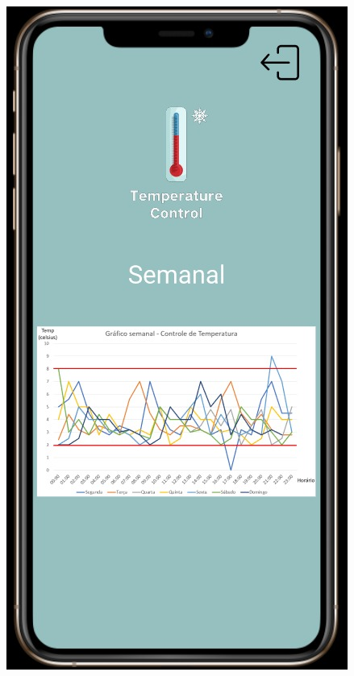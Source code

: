 \begin{figure}
\begin{minipage}{0.5\textwidth}
            \includegraphics[height=0.4\textheight]{img/mobile/temp_semanal.jpeg}
            \label{fig:mobileTempSemanal}
        \end{minipage}
    \end{figure}

